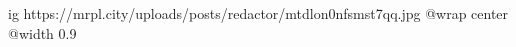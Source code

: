  
 
 
 
 

\ifcmt
  ig https://mrpl.city/uploads/posts/redactor/mtdlon0nfsmst7qq.jpg
  @wrap center
  @width 0.9
\fi
